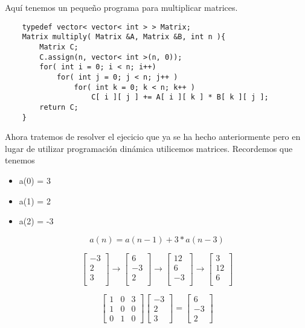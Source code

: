 Aquí tenemos un pequeño programa para multiplicar matrices.

\begin{lstlisting}
    typedef vector< vector< int > > Matrix;
    Matrix multiply( Matrix &A, Matrix &B, int n ){
        Matrix C;
        C.assign(n, vector< int >(n, 0));
        for( int i = 0; i < n; i++)
            for( int j = 0; j < n; j++ )
                for( int k = 0; k < n; k++ )
                    C[ i ][ j ] += A[ i ][ k ] * B[ k ][ j ];
        return C;
    }
\end{lstlisting}

Ahora tratemos de resolver el ejecicio que ya se ha hecho anteriormente pero en lugar de utilizar programación dinámica utilicemos matrices. Recordemos que tenemos
\begin{itemize}
    \item a(0) = 3
    \item a(1) = 2
    \item a(2) = -3
\end{itemize}

\[a(n) = a(n - 1) + 3 * a(n - 3)\]

\[
    { \begin{bmatrix}
        -3 \\
        2 \\
        3 \\
    \end{bmatrix} }
    \rightarrow
    { \begin{bmatrix}
        6 \\
        -3 \\
        2 \\
    \end{bmatrix} }
    \rightarrow
    { \begin{bmatrix}
        12 \\
        6 \\
        -3 \\
    \end{bmatrix} }
    \rightarrow
    { \begin{bmatrix}
        3 \\
        12 \\
        6 \\
    \end{bmatrix} }
\]

\[
    {\begin{bmatrix}
        1 & 0 & 3 \\
        1 & 0 & 0 \\
        0 & 1 & 0
    \end{bmatrix}}
    {\begin{bmatrix}
        -3 \\
        2 \\
        3
    \end{bmatrix}}
    =
    {\begin{bmatrix}
        6 \\
        -3 \\
        2
    \end{bmatrix}}
\]

